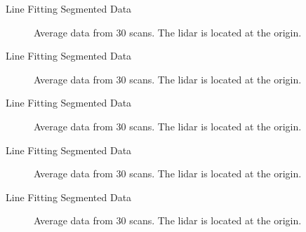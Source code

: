 \documentclass{beamer}
\begin{document}
\begin{frame}{Line Fitting Segmented Data}
    \begin{figure}
        \centering 
        
        \caption{Average data from 30 scans. The lidar is located at the origin.}
    \end{figure}
\end{frame}

\begin{frame}{Line Fitting Segmented Data}
    \begin{figure}
        \centering 
        
        \caption{Average data from 30 scans. The lidar is located at the origin.}
    \end{figure}
\end{frame}

\begin{frame}{Line Fitting Segmented Data}
    \begin{figure}
        \centering 
        
        \caption{Average data from 30 scans. The lidar is located at the origin.}
    \end{figure}
\end{frame}

\begin{frame}{Line Fitting Segmented Data}
    \begin{figure}
        \centering 
        
        \caption{Average data from 30 scans. The lidar is located at the origin.}
    \end{figure}
\end{frame}

\begin{frame}{Line Fitting Segmented Data}
    \begin{figure}
        \centering 
        
        \caption{Average data from 30 scans. The lidar is located at the origin.}
    \end{figure}
\end{frame}
\end{document}
